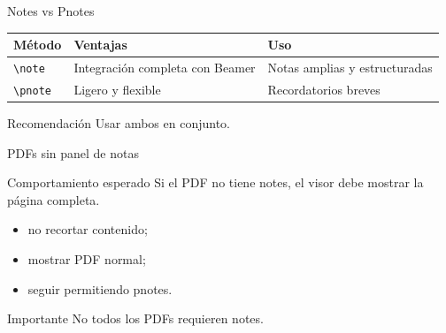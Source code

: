 \documentclass[aspectratio=169,professionalfonts]{beamer}
\begin{document}
\begin{frame}{Notes vs Pnotes}
\begin{table}
\centering
\small
\begin{tabular}{p{3cm} p{4.5cm} p{4.5cm}}
\toprule
Método & Ventajas & Uso \\
\midrule
\texttt{\textbackslash note} &
Integración completa con Beamer &
Notas amplias y estructuradas \\
\addlinespace
\texttt{\textbackslash pnote} &
Ligero y flexible &
Recordatorios breves \\
\bottomrule
\end{tabular}
\end{table}

\begin{exampleblock}{Recomendación}
Usar ambos en conjunto.
\end{exampleblock}

\end{frame}

\begin{frame}{PDFs sin panel de notas}
\begin{alertblock}{Comportamiento esperado}
Si el PDF no tiene notes, el visor debe mostrar la página completa.
\end{alertblock}

\begin{itemize}
  \item no recortar contenido;
  \item mostrar PDF normal;
  \item seguir permitiendo pnotes.
\end{itemize}

\begin{exampleblock}{Importante}
No todos los PDFs requieren notes.
\end{exampleblock}

\end{frame}
\end{document}
